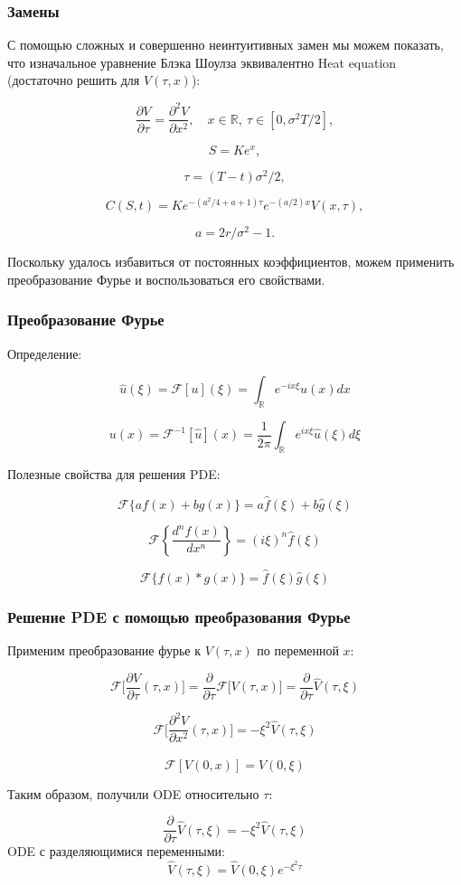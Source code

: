 \documentclass{beamer}
\begin{document}
\begin{frame}
\frametitle{Замены}

С помощью сложных и совершенно неинтуитивных замен мы можем показать, что изначальное уравнение Блэка Шоулза эквивалентно Heat equation (достаточно решить для \(V(\tau, x)\)):


\[
\frac{\partial V}{\partial \tau} = \frac{\partial^2 V}{\partial x^2}, \quad x \in \mathbb{R}, \ \tau \in [0, \sigma^2 T / 2],
\]

\[
S = K e^x,
\]

\[
\tau = (T - t) \sigma^2 / 2,
\]

\[
C(S, t) = K e^{-(a^2 / 4 + a + 1) \tau} e^{-(a / 2) x} V(x, \tau),
\]

\[
a = 2r / \sigma^2 - 1.
\]

Поскольку удалось избавиться от постоянных коэффициентов, можем применить преобразование Фурье и воспользоваться его свойствами. 
\end{frame}

\begin{frame}
\frametitle{Преобразование Фурье}

Определение:

\[ \hat{u}(\xi) = \mathcal{F} [u](\xi) = \int_\mathbb{R} e^{-ix \xi} u(x)dx\]

\[ u(x) = \mathcal{F}^{-1} [\hat{u}](x) = \frac{1}{2\pi}\int_\mathbb{R} e^{ix \xi} \hat{u}(\xi)d\xi\]

Полезные свойства для решения PDE:

\[ \mathcal{F}\{af(x) + bg(x)\} = a\hat{f}(\xi) + b\hat{g}(\xi) \]

\[ \mathcal{F}\left\{\frac{d^n f(x)}{dx^n}\right\} = (i\xi)^n \hat{f}(\xi) \]

\[ \mathcal{F}\{f(x) * g(x)\} = \hat{f}(\xi) \hat{g}(\xi) \]


\end{frame}


\begin{frame}
\frametitle{Решение PDE с помощью преобразования Фурье}

Применим преобразование фурье к $V(\tau, x)$ по переменной $x$:

\[
\mathcal{F}\bigg[\frac{\partial V}{\partial \tau} (\tau, x)\bigg] = \frac{\partial}{\partial \tau} \mathcal{F}\bigg[V(\tau, x)\bigg] = \frac{\partial}{\partial \tau} \hat{V}(\tau, \xi)
\]

\[
\mathcal{F}\bigg[\frac{\partial^2 V}{\partial x^2} (\tau, x)\bigg] = -\xi^2 \hat{V}(\tau, \xi)
\]

\[
\mathcal{F}[V(0, x)] = \hat{V}(0, \xi)
\]

Таким образом, получили ODE относительно $\tau$:

\[
\frac{\partial}{\partial \tau} \hat{V}(\tau, \xi) = -\xi^2 \hat{V}(\tau, \xi)
\]
ODE с разделяющимися переменными:
\[
\hat{V}(\tau, \xi) = \hat{V}(0, \xi) e^{-\xi^2 \tau}
\]

\end{frame}
\end{document}
